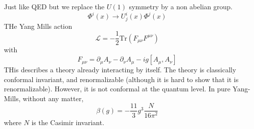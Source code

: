 \documentclass[a4paper]{book}
\theoremstyle{definition}
\theoremstyle{remark}
\begin{document}
Just like QED but we replace the $U(1)$ symmetry by a non abelian group. 
\begin{equation}
        \Phi^i (x) \rightarrow U^i_j (x) \Phi^j(x)
\end{equation}
THe Yang Mills action 
\begin{equation}
    \mathcal L = -\frac{1}{2}\text{Tr}(F_{\mu\nu}F^{\mu\nu})
\end{equation}
with
\begin{equation}
    F_{\mu\nu} = \partial_\mu A_\nu - \partial_\nu A_\mu - ig [A_\mu, A_\nu ]
\end{equation}
THis describes a theory already interacting by itself. The theory is classically conformal invariant, and renormalizable (although it is hard to show that it is renormalizable). However, it is not conformal at the quantum level. In pure Yang-Mills, without any matter, 
\begin{equation}
    \beta (g) = -\frac{11}{3}g^3 \frac{N}{16\pi^2}
\end{equation}
where $N$ is the Casimir invariant. 
\end{document}
